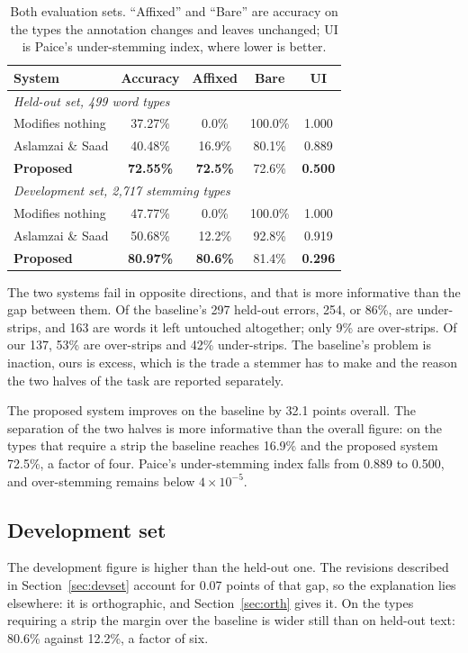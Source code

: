 \documentclass[conference]{IEEEtran}
\begin{document}
\begin{table}[t]
\caption{Both evaluation sets. ``Affixed'' and ``Bare'' are accuracy on the
types the annotation changes and leaves unchanged; UI is Paice's
under-stemming index, where lower is better.}
\label{tab:main}
\centering
\begin{tabular}{lcccc}
\toprule
System & Accuracy & Affixed & Bare & UI\\
\midrule
\multicolumn{5}{l}{\emph{Held-out set, 499 word types}}\\
Modifies nothing & 37.27\% & 0.0\% & 100.0\% & 1.000\\
Aslamzai \& Saad & 40.48\% & 16.9\% & 80.1\% & 0.889\\
\textbf{Proposed} & \textbf{72.55\%} & \textbf{72.5\%} & 72.6\% & \textbf{0.500}\\
\midrule
\multicolumn{5}{l}{\emph{Development set, 2{,}717 stemming types}}\\
Modifies nothing & 47.77\% & 0.0\% & 100.0\% & 1.000\\
Aslamzai \& Saad & 50.68\% & 12.2\% & 92.8\% & 0.919\\
\textbf{Proposed} & \textbf{80.97\%} & \textbf{80.6\%} & 81.4\% & \textbf{0.296}\\
\bottomrule
\end{tabular}
\end{table}

The two systems fail in opposite directions, and that is more informative than
the gap between them. Of the baseline's 297 held-out errors, 254, or 86\%, are under-strips, and 163 are words it left untouched altogether; only 9\% are
over-strips. Of our 137, 53\% are over-strips and 42\% under-strips. The
baseline's problem is inaction, ours is excess, which is the trade a stemmer
has to make and the reason the two halves of the task are reported separately.

The proposed system improves on the baseline by 32.1 points overall. The
separation of the two halves is more informative than the overall figure: on
the types that require a strip the baseline reaches 16.9\% and the proposed
system 72.5\%, a factor of four. Paice's under-stemming index falls from 0.889
to 0.500, and over-stemming remains below $4\times10^{-5}$.

\subsection{Development set}

The development figure is higher than the held-out one. The revisions described
in Section~\ref{sec:devset} account for 0.07 points of that gap, so the
explanation lies elsewhere: it is orthographic, and Section~\ref{sec:orth}
gives it. On the types requiring a strip the margin over the baseline is wider
still than on held-out text: 80.6\% against 12.2\%, a factor of six.
\end{document}

